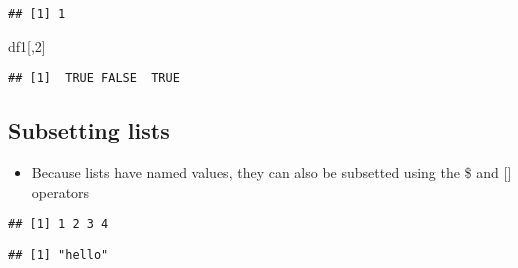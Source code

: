 \documentclass[]{article}
\newenvironment{Shaded}{\begin{snugshade}}{\end{snugshade}}
\newcommand{\KeywordTok}[1]{\textcolor[rgb]{0.13,0.29,0.53}{\textbf{#1}}}
\newcommand{\DataTypeTok}[1]{\textcolor[rgb]{0.13,0.29,0.53}{#1}}
\newcommand{\DecValTok}[1]{\textcolor[rgb]{0.00,0.00,0.81}{#1}}
\newcommand{\StringTok}[1]{\textcolor[rgb]{0.31,0.60,0.02}{#1}}
\newcommand{\OperatorTok}[1]{\textcolor[rgb]{0.81,0.36,0.00}{\textbf{#1}}}
\newcommand{\NormalTok}[1]{#1}
\providecommand{\tightlist}{%
  \setlength{\itemsep}{0pt}\setlength{\parskip}{0pt}}
\begin{document}
\begin{verbatim}
## [1] 1
\end{verbatim}

\begin{Shaded}
\begin{Highlighting}[]
\NormalTok{df1[,}\DecValTok{2}\NormalTok{]}
\end{Highlighting}
\end{Shaded}

\begin{verbatim}
## [1]  TRUE FALSE  TRUE
\end{verbatim}

\subsection{Subsetting lists}\label{subsetting-lists}

\begin{itemize}
\tightlist
\item
  Because lists have named values, they can also be subsetted using the
  \$ and {[}{]} operators
\end{itemize}

\begin{Shaded}
\end{Shaded}

\begin{verbatim}
## [1] 1 2 3 4
\end{verbatim}

\begin{Shaded}
\end{Shaded}

\begin{verbatim}
## [1] "hello"
\end{verbatim}
\end{document}
